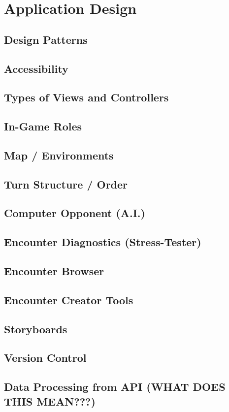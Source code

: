 \documentclass[12pt,a4paper]{report}
\begin{document}
	\newpage
	\section{Application Design}
		\subsection{Design Patterns}
		\subsection{Accessibility}
		\subsection{Types of Views and Controllers}
		\subsection{In-Game Roles}
		\subsection{Map / Environments}
		\subsection{Turn Structure / Order}
		\subsection{Computer Opponent (A.I.)}
		\subsection{Encounter Diagnostics (Stress-Tester)}
		\subsection{Encounter Browser}
		\subsection{Encounter Creator Tools}
		\subsection{Storyboards}
		\subsection{Version Control}
		\subsection{Data Processing from API (WHAT DOES THIS MEAN???)}
	
\end{document}
